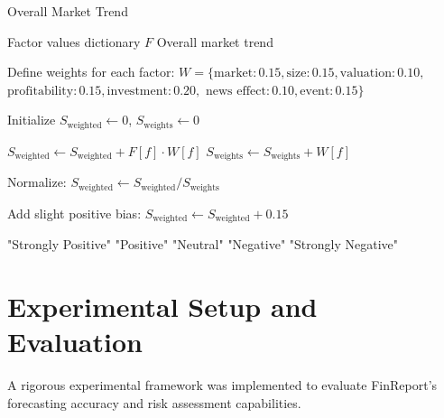 \documentclass[3p,times,procedia]{elsarticle}
\begin{document}
\begin{algorithm}
\caption{Overall Market Trend}
\label{alg:market_trend}
\begin{algorithmic}[1]
    \Require Factor values dictionary $F$
    \Ensure Overall market trend
    
    \State Define weights for each factor:
    \State \hspace{5mm} $W = \{ \text{market}: 0.15, \text{size}: 0.15, \text{valuation}: 0.10, $
    \State \hspace{10mm} $\text{profitability}: 0.15, \text{investment}: 0.20, $
    \State \hspace{10mm} $\text{news effect}: 0.10, \text{event}: 0.15 \}$

    \State Initialize $S_{\text{weighted}} \gets 0$, $S_{\text{weights}} \gets 0$
    
            \State $S_{\text{weighted}} \gets S_{\text{weighted}} + F[f] \cdot W[f]$
            \State $S_{\text{weights}} \gets S_{\text{weights}} + W[f]$
        \EndIf
    \EndFor

        \State Normalize: $S_{\text{weighted}} \gets S_{\text{weighted}} / S_{\text{weights}}$
    \EndIf
    
    \State Add slight positive bias: $S_{\text{weighted}} \gets S_{\text{weighted}} + 0.15$

        \State \Return "Strongly Positive"
        \State \Return "Positive"
        \State \Return "Neutral"
        \State \Return "Negative"
    \Else
        \State \Return "Strongly Negative"
    \EndIf

\end{algorithmic}
\end{algorithm}

\section{Experimental Setup and Evaluation}
A rigorous experimental framework was implemented to evaluate FinReport's forecasting accuracy and risk assessment capabilities.
\end{document}
